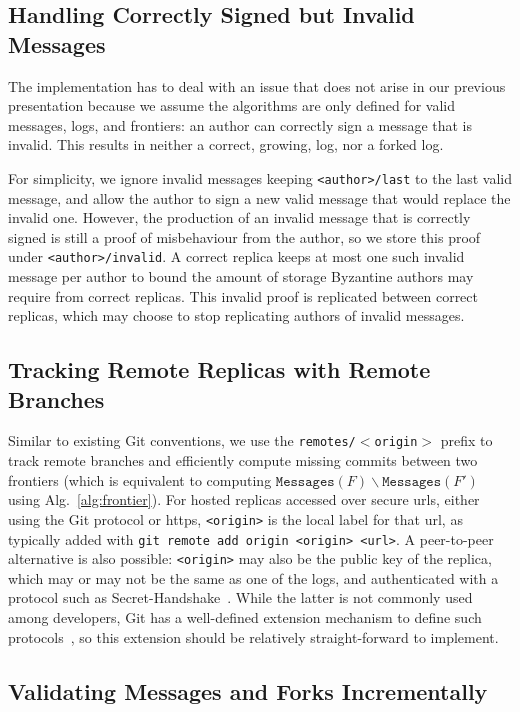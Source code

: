 \documentclass[9pt, oneside]{article}   	%
\begin{document}
\subsection{Handling Correctly Signed but Invalid Messages}

The implementation has to deal with an issue that does not arise in our previous presentation because we assume the algorithms are only defined for valid messages, logs, and frontiers: an author can correctly sign a message that is invalid. This results in neither a correct, growing, log, nor a forked log. 

For simplicity, we ignore invalid messages keeping \texttt{<author>/last} to the last valid message, and allow the author to sign a new valid message that would replace the invalid one. However, the production of an invalid message that is correctly signed is still a proof of misbehaviour from the author, so we store this proof under \texttt{<author>/invalid}. A correct replica keeps at most one such invalid message per author to bound the amount of storage Byzantine authors may require from correct replicas. This invalid proof is replicated between correct replicas, which may choose to stop replicating authors of invalid messages.


\subsection{Tracking Remote Replicas with Remote Branches}

Similar to existing Git conventions, we use the \texttt{remotes/$<$origin$>$} prefix to track remote branches and efficiently compute missing commits between two frontiers (which is equivalent to computing $\texttt{Messages}(F) \backslash \texttt{Messages}(F')$ using Alg.~\ref{alg:frontier}). For hosted replicas accessed over secure urls, either using the Git protocol or https, \texttt{<origin>} is the local label for that url, as typically added with \texttt{git remote add origin <origin> <url>}. A peer-to-peer alternative is also possible: \texttt{<origin>} may also be the public key of the replica, which may or may not be the same as one of the logs, and authenticated with a protocol such as Secret-Handshake~\cite{tarr2015shs}. While the latter is not commonly used among developers, Git has a well-defined extension mechanism to define such protocols~\cite{git-protocols}, so this extension should be relatively straight-forward to implement.

\subsection{Validating Messages and Forks Incrementally}
\end{document}

